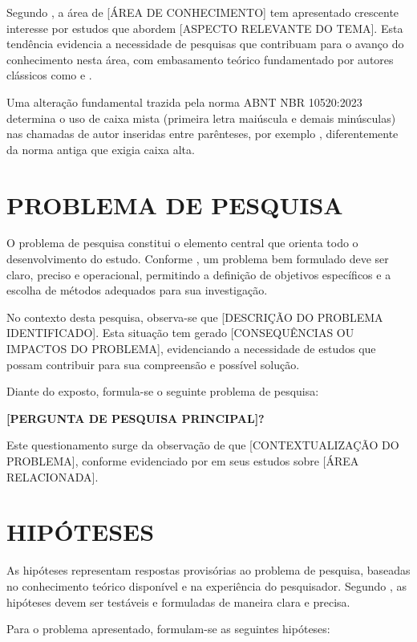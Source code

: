 Segundo , a área de [ÁREA DE CONHECIMENTO] tem apresentado crescente interesse por estudos que abordem [ASPECTO RELEVANTE DO TEMA]. Esta tendência evidencia a necessidade de pesquisas que contribuam para o avanço do conhecimento nesta área, com embasamento teórico fundamentado por autores clássicos como  e .

Uma alteração fundamental trazida pela norma ABNT NBR 10520:2023 determina o uso de caixa mista (primeira letra maiúscula e demais minúsculas) nas chamadas de autor inseridas entre parênteses, por exemplo \cite{marconi2017}, diferentemente da norma antiga que exigia caixa alta.


\section{PROBLEMA DE PESQUISA}
\label{sec:problema}

O problema de pesquisa constitui o elemento central que orienta todo o desenvolvimento do estudo. Conforme , um problema bem formulado deve ser claro, preciso e operacional, permitindo a definição de objetivos específicos e a escolha de métodos adequados para sua investigação.

No contexto desta pesquisa, observa-se que [DESCRIÇÃO DO PROBLEMA IDENTIFICADO]. Esta situação tem gerado [CONSEQUÊNCIAS OU IMPACTOS DO PROBLEMA], evidenciando a necessidade de estudos que possam contribuir para sua compreensão e possível solução.

Diante do exposto, formula-se o seguinte problema de pesquisa:

\textbf{[PERGUNTA DE PESQUISA PRINCIPAL]?}

Este questionamento surge da observação de que [CONTEXTUALIZAÇÃO DO PROBLEMA], conforme evidenciado por  em seus estudos sobre [ÁREA RELACIONADA].


\section{HIPÓTESES}
\label{sec:hipoteses}   

As hipóteses representam respostas provisórias ao problema de pesquisa, baseadas no conhecimento teórico disponível e na experiência do pesquisador. Segundo , as hipóteses devem ser testáveis e formuladas de maneira clara e precisa.

Para o problema apresentado, formulam-se as seguintes hipóteses:

